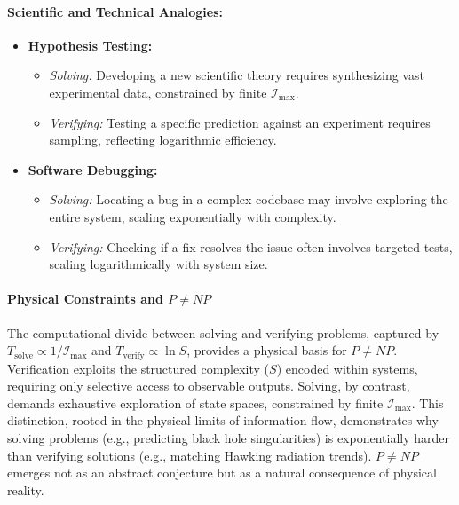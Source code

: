 \documentclass[12pt]{article}
\begin{document}
\paragraph{Scientific and Technical Analogies:}
\begin{itemize}
    \item \textbf{Hypothesis Testing:}
        \begin{itemize}
            \item \textit{Solving:} Developing a new scientific theory requires synthesizing vast experimental data, constrained by finite \(\mathcal{I}_{\text{max}}\).
            \item \textit{Verifying:} Testing a specific prediction against an experiment requires sampling, reflecting logarithmic efficiency.
        \end{itemize}
    \item \textbf{Software Debugging:}
        \begin{itemize}
            \item \textit{Solving:} Locating a bug in a complex codebase may involve exploring the entire system, scaling exponentially with complexity.
            \item \textit{Verifying:} Checking if a fix resolves the issue often involves targeted tests, scaling logarithmically with system size.
        \end{itemize}
\end{itemize}


\paragraph{Physical Constraints and \(P \neq NP\)}
The computational divide between solving and verifying problems, captured by \(T_{\text{solve}} \propto 1/\mathcal{I}_{\text{max}}\) and \(T_{\text{verify}} \propto \ln S\), provides a physical basis for \(P \neq NP\). Verification exploits the structured complexity (\(S\)) encoded within systems, requiring only selective access to observable outputs. Solving, by contrast, demands exhaustive exploration of state spaces, constrained by finite \(\mathcal{I}_{\text{max}}\). This distinction, rooted in the physical limits of information flow, demonstrates why solving problems (e.g., predicting black hole singularities) is exponentially harder than verifying solutions (e.g., matching Hawking radiation trends). \(P \neq NP\) emerges not as an abstract conjecture but as a natural consequence of physical reality.
\end{document}

